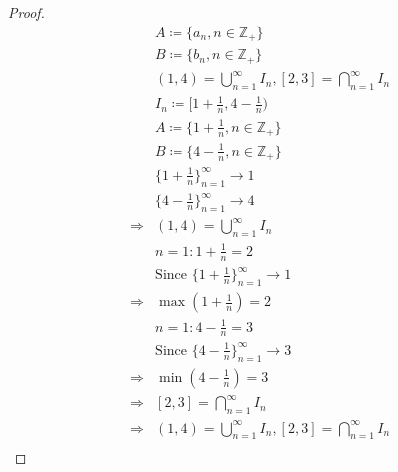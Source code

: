 \documentclass{article}
\begin{document}
\begin{proof}
    \begin{align*}
        &A\coloneqq\{a_n,n\in\mathbb{Z} _+\}\\
        &B\coloneqq\{b_n,n\in\mathbb{Z} _+\}\\
        &(1,4)=\bigcup_{n=1}^{\infty}I_n,[2,3]=\bigcap_{n=1}^{\infty}I_n\\
        &I_n\coloneqq[1+\frac{1}{n},4-\frac{1}{n})\\
        &A\coloneqq\{1+\frac{1}{n},n\in\mathbb{Z} _+\}\\
        &B\coloneqq\{4-\frac{1}{n},n\in\mathbb{Z} _+\}\\
        &\{1+\frac{1}{n}\}^\infty_{n=1}\rightarrow1\\
        &\{4-\frac{1}{n}\}^\infty_{n=1}\rightarrow4\\
        \Rightarrow&(1,4)=\bigcup_{n=1}^{\infty}I_n\\
        &n=1:1+\frac{1}{n}=2\\
        &\text{Since }\{1+\frac{1}{n}\}^\infty_{n=1}\rightarrow1\\
        \Rightarrow&\max (1+\frac{1}{n})=2\\
        &n=1:4-\frac{1}{n}=3\\
        &\text{Since }\{4-\frac{1}{n}\}^\infty_{n=1}\rightarrow3\\
        \Rightarrow&\min (4-\frac{1}{n})=3\\
        \Rightarrow&[2,3]=\bigcap_{n=1}^{\infty}I_n\\
        \Rightarrow&(1,4)=\bigcup_{n=1}^{\infty}I_n,[2,3]=\bigcap_{n=1}^{\infty}I_n\\
    \end{align*}
\end{proof}
\end{document}
